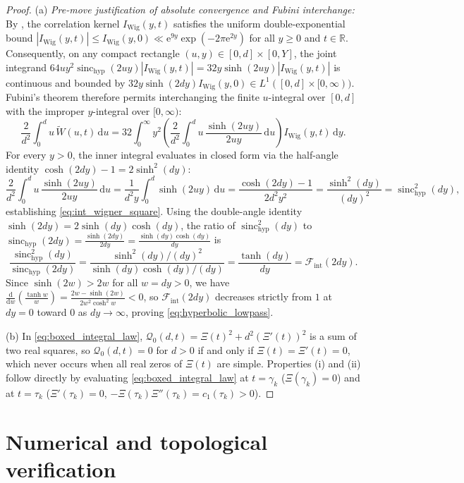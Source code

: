 \documentclass[11pt,a4paper,reqno]{amsart}
\theoremstyle{definition}
\theoremstyle{remark}
\numberwithin{equation}{section}
\newcommand{\dd}{\mathrm{d}}
\newcommand{\ee}{\mathrm{e}}
\newcommand{\Wtil}{\widetilde{W}}
\newcommand{\sinch}{\operatorname{sinc}_{\mathrm{hyp}}}
\newcommand{\Fint}{\mathcal{F}_{\mathrm{int}}}
\begin{document}
\begin{proof}
(a) \emph{Pre-move justification of absolute convergence and Fubini interchange:} By \cite[Lemma~3.1]{Missiaen2026Paper1}, the correlation kernel $I_{\mathrm{Wig}}(y,t)$ satisfies the uniform double-exponential bound $|I_{\mathrm{Wig}}(y,t)| \le I_{\mathrm{Wig}}(y,0) \ll \ee^{9y}\exp(-2\pi\ee^{2y})$ for all $y \ge 0$ and $t \in \mathbb{R}$. Consequently, on any compact rectangle $(u,y) \in [0,d] \times [0,Y]$, the joint integrand $64 u y^2\sinch(2u y)|I_{\mathrm{Wig}}(y,t)| = 32 y\sinh(2u y)|I_{\mathrm{Wig}}(y,t)|$ is continuous and bounded by $32 y\sinh(2d y)I_{\mathrm{Wig}}(y,0) \in L^1([0,d]\times[0,\infty))$. Fubini's theorem therefore permits interchanging the finite $u$-integral over $[0,d]$ with the improper $y$-integral over $[0,\infty)$:
\[
\frac{2}{d^2}\int_0^d u\,\Wtil(u,t)\,\dd u = 32\int_0^\infty y^2\left(\frac{2}{d^2}\int_0^d u\,\frac{\sinh(2u y)}{2u y}\,\dd u\right)I_{\mathrm{Wig}}(y,t)\,\dd y.
\]
For every $y > 0$, the inner integral evaluates in closed form via the half-angle identity $\cosh(2d y) - 1 = 2\sinh^2(d y)$:
\[
\frac{2}{d^2}\int_0^d u\,\frac{\sinh(2u y)}{2u y}\,\dd u = \frac{1}{d^2 y}\int_0^d \sinh(2u y)\,\dd u = \frac{\cosh(2d y) - 1}{2d^2 y^2} = \frac{\sinh^2(d y)}{(d y)^2} = \sinch^2(d y),
\]
establishing \eqref{eq:int_wigner_square}. Using the double-angle identity $\sinh(2d y) = 2\sinh(d y)\cosh(d y)$, the ratio of $\sinch^2(d y)$ to $\sinch(2d y) = \frac{\sinh(2d y)}{2d y} = \frac{\sinh(d y)\cosh(d y)}{d y}$ is
\[
\frac{\sinch^2(d y)}{\sinch(2d y)} = \frac{\sinh^2(d y)/(d y)^2}{\sinh(d y)\cosh(d y)/(d y)} = \frac{\tanh(d y)}{d y} = \Fint(2d y).
\]
Since $\sinh(2w) > 2w$ for all $w = d y > 0$, we have $\frac{\dd}{\dd w}(\frac{\tanh w}{w}) = \frac{2w - \sinh(2w)}{2w^2\cosh^2 w} < 0$, so $\Fint(2d y)$ decreases strictly from $1$ at $d y = 0$ toward $0$ as $d y \to \infty$, proving \eqref{eq:hyperbolic_lowpass}.

(b) In \eqref{eq:boxed_integral_law}, $\mathcal{Q}_0(d,t) = \Xi(t)^2 + d^2(\Xi'(t))^2$ is a sum of two real squares, so $\mathcal{Q}_0(d,t) = 0$ for $d > 0$ if and only if $\Xi(t) = \Xi'(t) = 0$, which never occurs when all real zeros of $\Xi(t)$ are simple. Properties (i) and (ii) follow directly by evaluating \eqref{eq:boxed_integral_law} at $t = \gamma_k$ ($\Xi(\gamma_k) = 0$) and at $t = \tau_k$ ($\Xi'(\tau_k) = 0$, $-\Xi(\tau_k)\Xi''(\tau_k) = c_1(\tau_k) > 0$).
\end{proof}

\section{Numerical and topological verification}\label{sec:numerics}
\end{document}

